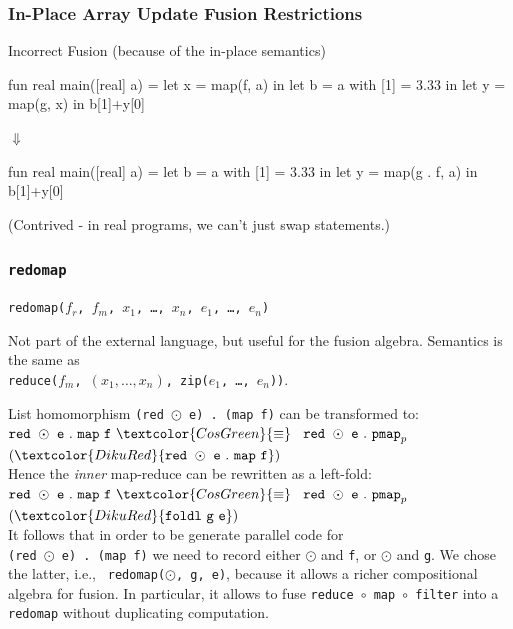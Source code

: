 \documentclass{beamer}
\newcommand{\emp}[1]{\textcolor{DikuRed}{ #1}}
\newcommand{\emphh}[1]{\textcolor{CosGreen}{ #1}}
\begin{document}
\begin{frame}[fragile,t]
  \frametitle{In-Place Array Update Fusion Restrictions}

  \begin{block}{Incorrect Fusion (because of the in-place semantics)}
    \begin{center}
      \begin{colorcode}[fontsize=\scriptsize]
fun real main([real] a) =
  let x      = map(f, a)    in
  let b = a with [1] = 3.33 in
  let y      = map(g, x)    in
  b[1]+y[0]
      \end{colorcode}
      $\Downarrow$
      \begin{colorcode}[fontsize=\scriptsize]
fun real main([real] a) =
  let b = a with [1] = 3.33   in
  let y      = map(g . f, a)  in
  b[1]+y[0]
      \end{colorcode}
    \end{center}
  \end{block}

(Contrived - in real programs, we can't just swap statements.)

\end{frame}

\begin{frame}[fragile,t]
  \frametitle{{\tt redomap}}

  {\tt redomap($f_{r}$, $f_{m}$, $x_{1}$, \ldots, $x_{n}$, $e_{1}$, \ldots, $e_{n}$)}

  Not part of the external language, but useful for the fusion
  algebra.  Semantics is the same as\\{\tt reduce($f_{m}$, $(x_{1},\ldots,x_{n})$, zip($e_{1}$, \ldots, $e_{n}$))}.
\pause
\begin{block}{List homomorphism} {\tt (red $\odot$ e) . (map f)} can
  be transformed to:  \\
  ${\tt red}\mbox{ }\odot\mbox{ }{\tt e}\mbox{ }.\mbox{ }{\tt
    map}\mbox{ }{\tt f}\mbox{ }\emphh{\equiv}$ $\mbox{ }{\tt
    red}\mbox{ }\odot\mbox{ }{\tt e}\mbox{ }.\mbox{ }{\tt pmap}_{p}
  \mbox{ }$ $(\emp{{\tt red} \mbox{
    }\odot\mbox{ }{\tt e}\mbox{ }.\mbox{ }{\tt map}\mbox{ }{\tt f}})$\\
  Hence the {\em inner} map-reduce can be
  rewritten as a left-fold:\\
  ${\tt red}\mbox{ }\odot\mbox{ }{\tt e}\mbox{ }.\mbox{ }{\tt
    map}\mbox{ }{\tt f}\mbox{ }\emphh{\equiv}$ $\mbox{ }{\tt
    red}\mbox{ }\odot\mbox{ }{\tt e}\mbox{ }.\mbox{ }{\tt pmap}_{p}
  \mbox{ }$ $(\emp{{\tt foldl}\mbox{
    }{\tt g}\mbox{ }{\tt e}})$\\
  It follows that in order to be generate parallel code for \\
  {\tt (red $\odot$ e) . (map f)} we need to record either $\odot$ and
  {\tt f}, or $\odot$ and {\tt g}. We chose the latter, i.e., {\tt
    redomap($\odot$, g, e)}, because it allows a richer compositional
  algebra for fusion.  In particular, it allows to fuse {\tt reduce
    $\circ$ map $\circ$ filter} into a {\tt redomap} without
  duplicating computation.
\end{block}

\end{frame}
\end{document}

